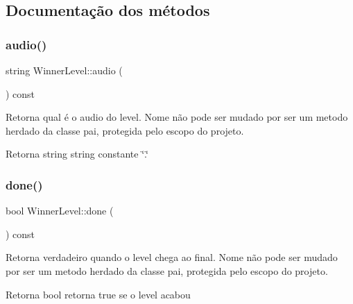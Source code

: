 \subsection{Documentação dos métodos}
\mbox{\label{classWinnerLevel_a855561f4edd534aa309d2b2a5d6ee3bd}} 
\subsubsection{\texorpdfstring{audio()}{audio()}}
{\footnotesize\ttfamily string Winner\+Level\+::audio (\begin{DoxyParamCaption}{ }\end{DoxyParamCaption}) const}



Retorna qual é o audio do level. Nome não pode ser mudado por ser um metodo herdado da classe pai, protegida pelo escopo do projeto. 

\begin{DoxyReturn}{Retorna}
string string constante \char`\"{}.\char`\"{} 
\end{DoxyReturn}
\mbox{\label{classWinnerLevel_afc61ffd9b0457d81a2ed7400dc3490df}} 
\subsubsection{\texorpdfstring{done()}{done()}}
{\footnotesize\ttfamily bool Winner\+Level\+::done (\begin{DoxyParamCaption}{ }\end{DoxyParamCaption}) const}



Retorna verdadeiro quando o level chega ao final. Nome não pode ser mudado por ser um metodo herdado da classe pai, protegida pelo escopo do projeto. 

\begin{DoxyReturn}{Retorna}
bool retorna \textquotesingle{}true\textquotesingle{} se o level acabou 
\end{DoxyReturn}
\mbox{\label{classWinnerLevel_a0b58acd2f2c85ce28df09260684f3180}} 
